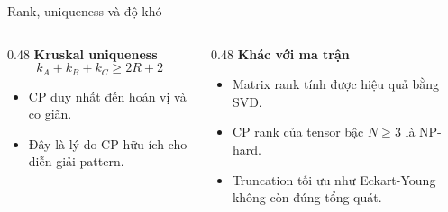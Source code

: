 \begin{frame}{Rank, uniqueness và độ khó}
\begin{columns}[T,totalwidth=\textwidth]
    \begin{column}{0.48\textwidth}
        \textbf{Kruskal uniqueness}
        \[
            k_A+k_B+k_C\ge 2R+2
        \]
        \begin{itemize}
            \item CP duy nhất đến hoán vị và co giãn.
            \item Đây là lý do CP hữu ích cho diễn giải pattern.
        \end{itemize}
    \end{column}
    \begin{column}{0.48\textwidth}
        \textbf{Khác với ma trận}
        \begin{itemize}
            \item Matrix rank tính được hiệu quả bằng SVD.
            \item CP rank của tensor bậc $N\ge3$ là NP-hard.
            \item Truncation tối ưu như Eckart-Young không còn đúng tổng quát.
        \end{itemize}
    \end{column}
\end{columns}
\end{frame}
